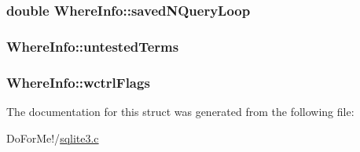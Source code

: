 \hypertarget{struct_where_info_a42261b8c4fbc968e0096fa13ea4c00a7}{
\subsubsection[{saved\-N\-Query\-Loop}]{\setlength{\rightskip}{0pt plus 5cm}double Where\-Info\-::saved\-N\-Query\-Loop}}\label{struct_where_info_a42261b8c4fbc968e0096fa13ea4c00a7}
\hypertarget{struct_where_info_a4f925cad7a0a9ff977eef944969673d8}{
\subsubsection[{untested\-Terms}]{ Where\-Info\-::untested\-Terms}}\label{struct_where_info_a4f925cad7a0a9ff977eef944969673d8}
\hypertarget{struct_where_info_a85ac59be7be01c6b08f8b225585d27e0}{
\subsubsection[{wctrl\-Flags}]{ Where\-Info\-::wctrl\-Flags}}\label{struct_where_info_a85ac59be7be01c6b08f8b225585d27e0}


The documentation for this struct was generated from the following file\-:\begin{DoxyCompactItemize}
\item 
Do\-For\-Me!/\hyperlink{sqlite3_8c}{sqlite3.\-c}\end{DoxyCompactItemize}

